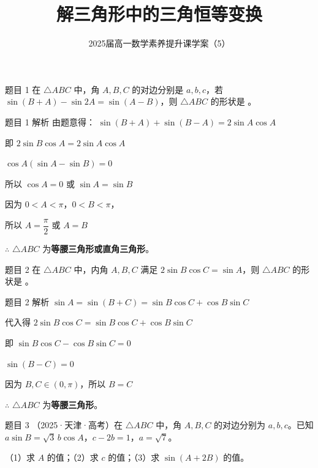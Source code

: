 \documentclass[UTF8]{ctexbeamer}
\title{解三角形中的三角恒等变换}
\subtitle{2025届高一数学素养提升课学案（5）}
\author{}
\date{}
\begin{document}
	
	\begin{frame}
		\titlepage
	\end{frame}
	
	\begin{frame}{题目 1}
		在 $\triangle ABC$ 中，角 $A, B, C$ 的对边分别是 $a, b, c$，若 $\sin(B+A) - \sin 2A = \sin(A-B)$，则 $\triangle ABC$ 的形状是 \underline{\hspace{2cm}}。
	\end{frame}
	
	\begin{frame}{题目 1 \quad 解析}
		由题意得：
		$\sin(B+A) + \sin(B-A) = 2\sin A\cos A$
		\pause
		
		即 $2\sin B\cos A = 2\sin A\cos A$
		\pause
		
		$\cos A(\sin A - \sin B) = 0$
		\pause
		
		所以 $\cos A = 0$ 或 $\sin A = \sin B$
		\pause
		
		因为 $0 < A < \pi$，$0 < B < \pi$，
		
		所以 $A = \dfrac{\pi}{2}$ 或 $A = B$
		\pause
		
		\vspace{0.3cm}
		$\therefore$ $\triangle ABC$ 为\textbf{等腰三角形或直角三角形}。
	\end{frame}
	
	\begin{frame}{题目 2}
		在 $\triangle ABC$ 中，内角 $A, B, C$ 满足 $2\sin B \cos C = \sin A$，则 $\triangle ABC$ 的形状是 \underline{\hspace{2cm}}。
	\end{frame}
	
	\begin{frame}{题目 2 \quad 解析}
		$\sin A = \sin(B+C) = \sin B\cos C + \cos B\sin C$
		\pause
		
		代入得 $2\sin B\cos C = \sin B\cos C + \cos B\sin C$
		\pause
		
		即 $\sin B\cos C - \cos B\sin C = 0$
		\pause
		
		$\sin(B - C) = 0$
		\pause
		
		因为 $B, C \in (0, \pi)$，所以 $B = C$
		\pause
		
		\vspace{0.3cm}
		$\therefore$ $\triangle ABC$ 为\textbf{等腰三角形}。
	\end{frame}
	
	\begin{frame}{题目 3}
		（2025·天津·高考）在 $\triangle ABC$ 中，角 $A, B, C$ 的对边分别为 $a, b, c$。已知 $a\sin B = \sqrt{3}\,b\cos A$，$c - 2b = 1$，$a = \sqrt{7}$。
		
		\vspace{0.3cm}
		（1）求 $A$ 的值；\quad （2）求 $c$ 的值；\quad （3）求 $\sin(A+2B)$ 的值。
	\end{frame}
	
\end{document}
